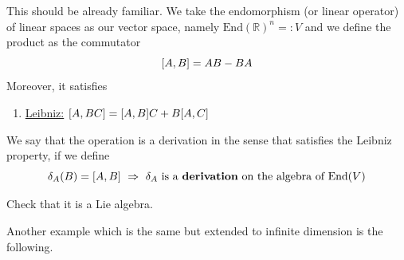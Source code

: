\documentclass[../main.tex]{subfiles}
\begin{document}
\begin{example}
This should be already familiar. We take the endomorphism (or linear operator) of linear spaces as our vector space, namely $\textrm{End}(\mathbb{R})^n=:V$ and we define the product as the commutator
\[
\comm{A}{B}=AB-BA
\]
Moreover, it satisfies
\begin{enumerate}\renewcommand{\labelenumi}{(L4)}
    \item \underline{Leibniz:} $\comm{A}{BC}=\comm{A}{B}C+B\comm{A}{C}$
\end{enumerate}
We say that the operation is a derivation in the sense that satisfies the Leibniz property, if we define
\[
\delta_A(B)= \comm{A}{B} \ \Rightarrow \ \delta_A \textrm{ is a \textbf{derivation} on the algebra of $\textrm{End}(V)$}
\]
\end{example}
\begin{exercise}
Check that it is a Lie algebra.
\end{exercise}
Another example which is the same but extended to infinite dimension is the following.
\end{document}
